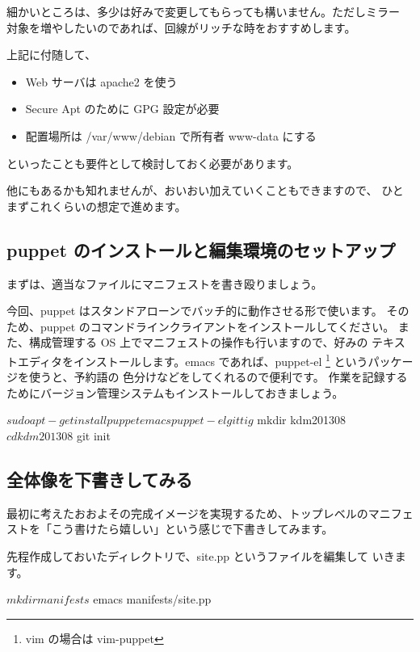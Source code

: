 \documentclass[mingoth,a4paper]{jsarticle}
\begin{document}
細かいところは、多少は好みで変更してもらっても構いません。ただしミラー
対象を増やしたいのであれば、回線がリッチな時をおすすめします。

上記に付随して、

\begin{itemize}
\item
  Web サーバは apache2 を使う
\item
  Secure Apt のために GPG 設定が必要
\item
  配置場所は /var/www/debian で所有者 www-data にする
\end{itemize}

といったことも要件として検討しておく必要があります。

他にもあるかも知れませんが、おいおい加えていくこともできますので、
ひとまずこれくらいの想定で進めます。

\subsection{puppet のインストールと編集環境のセットアップ}

まずは、適当なファイルにマニフェストを書き殴りましょう。

今回、puppet はスタンドアローンでバッチ的に動作させる形で使います。
そのため、puppet のコマンドラインクライアントをインストールしてください。
また、構成管理する OS 上でマニフェストの操作も行いますので、好みの
テキストエディタをインストールします。emacs であれば、puppet-el
\footnote{vim の場合は vim-puppet} というパッケージを使うと、予約語の
色分けなどをしてくれるので便利です。
作業を記録するためにバージョン管理システムもインストールしておきましょう。

\begin{commandline}
$ sudo apt-get install puppet emacs puppet-el git tig

$ mkdir kdm201308
$ cd kdm201308
$ git init
\end{commandline}

\subsection{全体像を下書きしてみる}

最初に考えたおおよその完成イメージを実現するため、トップレベルのマニフェ
ストを「こう書けたら嬉しい」という感じで下書きしてみます。

先程作成しておいたディレクトリで、site.pp というファイルを編集して
いきます。

\begin{commandline}
$ mkdir manifests
$ emacs manifests/site.pp
\end{commandline}
\end{document}
